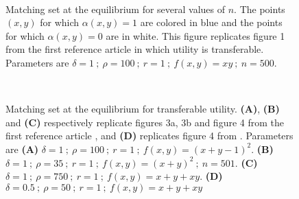 \def \smallScl {0.15}
\def \mediumScl {0.2}
\def \largeScl {0.3}



\begin{figure}[!ht]
	\centering
	\quad
	\quad
	\\
	\caption{Matching set at the equilibrium for several values of $n$. The points $(x,y)$ for which $\alpha(x,y)=1$ are colored in blue and the points for which $\alpha(x,y)=0$ are in white. This figure replicates figure 1 from the first reference article \citep{shimer_assortative_2000} in which utility is transferable. Parameters are $\delta=1 \ ; \ \rho=100 \ ; \ r=1 \ ; \ f(x,y)=xy \ ; \ n=500$.}
	\label{fig:fig1}
\end{figure}

 

\begin{figure}[!ht]
	\centering
	\quad
	\\
	\quad
	\caption{Matching set at the equilibrium for transferable utility. \textbf{(A)}, \textbf{(B)} and \textbf{(C)} respectively replicate figures 3a, 3b and figure 4 from the first reference article \citep{shimer_assortative_2000}, and \textbf{(D)} replicates figure 4 from \citep{smith_frictional_2011}. Parameters are \textbf{(A)} $\delta=1 \ ; \ \rho=100 \ ; \ r=1 \ ; \ f(x,y)=(x+y-1)^2$. \textbf{(B)} $\delta=1 \ ; \ \rho=35 \ ; \ r=1 \ ; \ f(x,y)=(x+y)^2 \ ; \ n=501$. \textbf{(C)} $\delta=1 \ ; \ \rho=750 \ ; \ r=1 \ ; \ f(x,y)=x+y+xy$. \textbf{(D)} $\delta=0.5 \ ; \ \rho=50 \ ; \ r=1 \ ; \ f(x,y)=x+y+xy$}
	\label{fig:fig2}
\end{figure}





